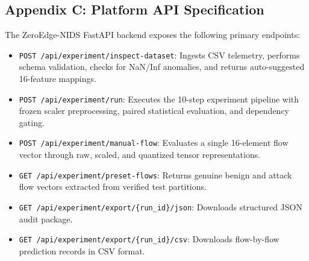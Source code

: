 \subsection{Appendix C: Platform API Specification}
The ZeroEdge-NIDS FastAPI backend exposes the following primary endpoints:
\begin{itemize}
    \item \texttt{POST /api/experiment/inspect-dataset}: Ingests CSV telemetry, performs schema validation, checks for NaN/Inf anomalies, and returns auto-suggested 16-feature mappings.
    \item \texttt{POST /api/experiment/run}: Executes the 10-step experiment pipeline with frozen scaler preprocessing, paired statistical evaluation, and dependency gating.
    \item \texttt{POST /api/experiment/manual-flow}: Evaluates a single 16-element flow vector through raw, scaled, and quantized tensor representations.
    \item \texttt{GET /api/experiment/preset-flows}: Returns genuine benign and attack flow vectors extracted from verified test partitions.
    \item \texttt{GET /api/experiment/export/\{run\_id\}/json}: Downloads structured JSON audit package.
    \item \texttt{GET /api/experiment/export/\{run\_id\}/csv}: Downloads flow-by-flow prediction records in CSV format.
\end{itemize}
